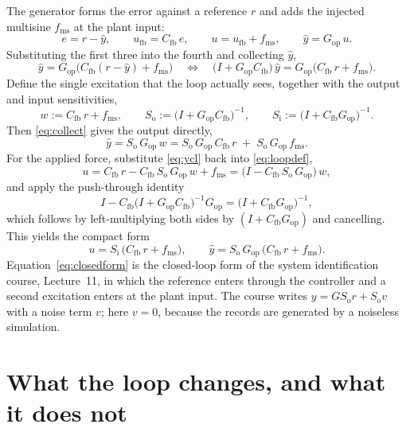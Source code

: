 \documentclass[11pt]{article}
\newcommand{\yh}{\hat{y}}
\newcommand{\Cfb}{C_{\mathrm{fb}}}
\newcommand{\Gop}{G_{\mathrm{op}}}
\newcommand{\So}{S_{\mathrm{o}}}
\newcommand{\Si}{S_{\mathrm{i}}}
\newcommand{\fms}{f_{\mathrm{ms}}}
\newcommand{\ufb}{u_{\mathrm{fb}}}
\begin{document}
The generator forms the error against a reference $r$ and adds the injected multisine $\fms$ at
the plant input:
\begin{equation}
  e = r - \yh , \qquad
  \ufb = \Cfb\,e , \qquad
  u = \ufb + \fms , \qquad
  \yh = \Gop\,u .
  \label{eq:loopdef}
\end{equation}
Substituting the first three into the fourth and collecting $\yh$,
\begin{equation}
  \yh = \Gop\big(\Cfb (r - \yh) + \fms\big)
  \quad\Longleftrightarrow\quad
  \big(I + \Gop\Cfb\big)\,\yh = \Gop\big(\Cfb\,r + \fms\big) .
  \label{eq:collect}
\end{equation}
Define the single excitation that the loop actually sees, together with the output and input
sensitivities,
\begin{equation}
  w := \Cfb\,r + \fms , \qquad
  \So := \big(I + \Gop\Cfb\big)^{-1} , \qquad
  \Si := \big(I + \Cfb\Gop\big)^{-1} .
  \label{eq:sens}
\end{equation}
Then \eqref{eq:collect} gives the output directly,
\begin{equation}
  \yh = \So\,\Gop\,w = \So\,\Gop\,\Cfb\,r \;+\; \So\,\Gop\,\fms .
  \label{eq:ycl}
\end{equation}
For the applied force, substitute \eqref{eq:ycl} back into \eqref{eq:loopdef},
\begin{equation}
  u = \Cfb\,r - \Cfb\,\So\,\Gop\,w + \fms
    = \big(I - \Cfb\,\So\,\Gop\big)\,w ,
  \label{eq:ustep}
\end{equation}
and apply the push-through identity
\begin{equation}
  I - \Cfb\big(I + \Gop\Cfb\big)^{-1}\Gop = \big(I + \Cfb\Gop\big)^{-1} ,
  \label{eq:pushthrough}
\end{equation}
which follows by left-multiplying both sides by $(I + \Cfb\Gop)$ and cancelling. This yields the
compact form
\begin{equation}
  \boxed{\;u = \Si\,\big(\Cfb\,r + \fms\big) , \qquad
         \yh = \So\,\Gop\,\big(\Cfb\,r + \fms\big) . \;}
  \label{eq:closedform}
\end{equation}
Equation~\eqref{eq:closedform} is the closed-loop form of the system identification course,
Lecture~11, in which the reference enters through the controller and a second excitation enters
at the plant input. The course writes $y = G\So r + \So v$ with a noise term $v$; here $v = 0$,
because the records are generated by a noiseless simulation.

\section{What the loop changes, and what it does not}
\label{sec:conseq}
\end{document}
